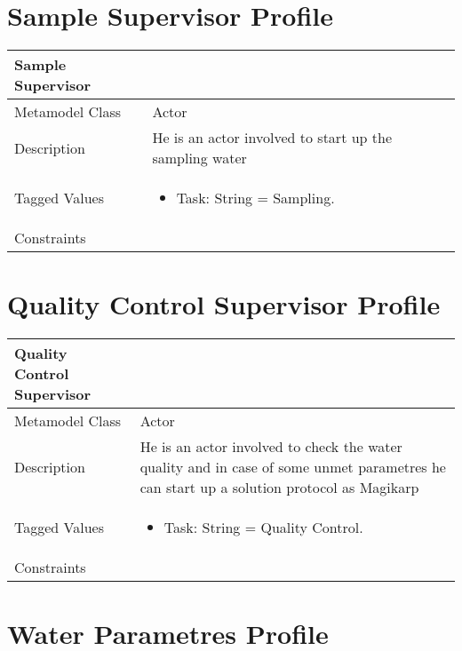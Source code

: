 \section{Sample Supervisor Profile}

\begin{longtable}{|p{4cm}|p{9cm}|}

\hline
\textbf{Sample Supervisor} & \\


\hline
Metamodel Class & Actor\\

\hline
Description & He is an actor involved to start up the sampling water\\

\hline
Tagged Values & 
\begin{itemize}
\item Task: String = Sampling.
\end{itemize}\\

\hline
Constraints &\\

\hline
\end{longtable}


\section{Quality Control Supervisor Profile}

\begin{longtable}{|p{4cm}|p{9cm}|}

\hline
\textbf{Quality Control Supervisor} & \\


\hline
Metamodel Class & Actor\\

\hline
Description & He is an actor involved to check the water quality and in case of some unmet parametres he can start up a solution protocol as Magikarp\\

\hline
Tagged Values & 
\begin{itemize}
\item Task: String = Quality Control.
\end{itemize}\\

\hline
Constraints &\\

\hline
\end{longtable}

\section{Water Parametres Profile}

